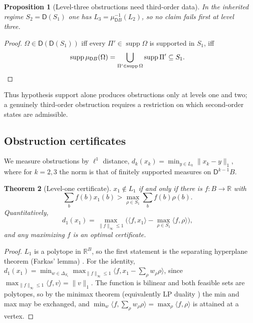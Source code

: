 \documentclass[11pt]{article}
\newtheorem{theorem}{Theorem}[section]
\newtheorem{proposition}[theorem]{Proposition}
\theoremstyle{definition}
\theoremstyle{remark}
\newcommand{\D}{\mathsf{D}}
\begin{document}
\begin{proposition}[Level-three obstructions need third-order data]\label{prop:inherited}
In the inherited regime $S_2=\D(S_1)$ one has $L_3=\mu_{\D B}^{-1}(L_2)$, so no claim fails first at
level three.
\end{proposition}
\begin{proof}
$\Omega\in\D(\D(S_1))$ iff every $\Pi'\in\operatorname{supp}\Omega$ is supported in $S_1$, iff
\[
\operatorname{supp}\mu_{\D B}(\Omega)=\bigcup_{\Pi'\in\operatorname{supp}\Omega}\operatorname{supp}\Pi'
\subseteq S_1. \qedhere
\]
\end{proof}

Thus hypothesis support alone produces obstructions only at levels one and two; a genuinely
third-order obstruction requires a restriction on which second-order states are admissible.

\subsection{Obstruction certificates}

We measure obstructions by $\ell^1$ distance, $d_k(x_k)=\min_{y\in L_k}\lVert x_k-y\rVert_1$, where for
$k=2,3$ the norm is that of finitely supported measures on $\D^{k-1}B$.

\begin{theorem}[Level-one certificate]\label{thm:cert1}
$x_1\notin L_1$ if and only if there is $f\colon B\to\mathbb{R}$ with
\[
\textstyle\sum_bf(b)x_1(b)>\max_{\rho\in S_1}\sum_bf(b)\rho(b).
\]
Quantitatively,
\[
d_1(x_1)=\max_{\lVert f\rVert_\infty\le1}\Big(\langle f,x_1\rangle-\max_{\rho\in S_1}\langle f,\rho\rangle\Big),
\]
and any maximizing $f$ is an optimal certificate.
\end{theorem}
\begin{proof}
$L_1$ is a polytope in $\mathbb{R}^B$, so the first statement is the separating hyperplane theorem
(Farkas' lemma) \cite{Schrijver1986}. For the identity,
$d_1(x_1)=\min_{w\in\Delta_{S_1}}\max_{\lVert f\rVert_\infty\le1}\langle f,x_1-\sum_\rho w_\rho\rho\rangle$, since
$\max_{\lVert f\rVert_\infty\le1}\langle f,v\rangle=\lVert v\rVert_1$. The function is bilinear and both
feasible sets are polytopes, so by the minimax theorem (equivalently LP duality \cite{Schrijver1986})
the min and max may be exchanged, and $\min_w\langle f,\sum_\rho w_\rho\rho\rangle=\max_\rho\langle
f,\rho\rangle$ is attained at a vertex.
\end{proof}
\end{document}
